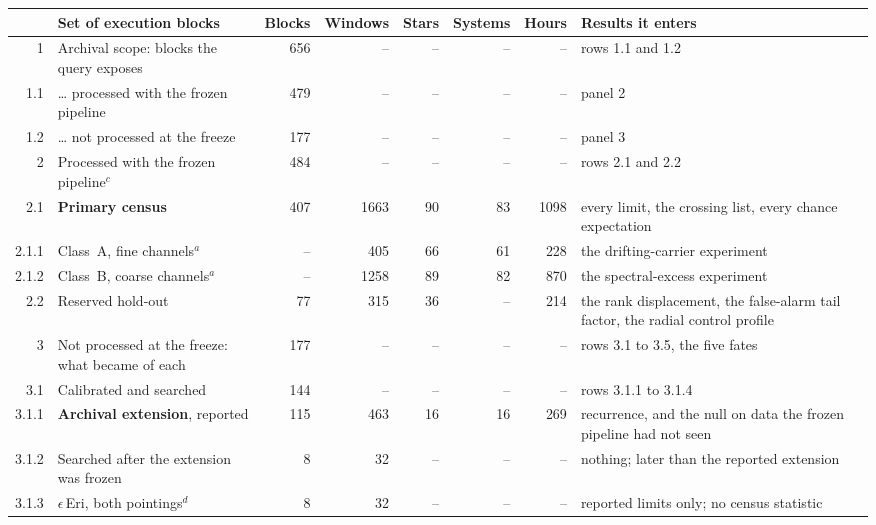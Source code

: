 \begin{tabular}{@{}r@{~}p{}rrrrrp{}@{}}
\hline
 & Set of execution blocks & Blocks & Windows & Stars & Systems & Hours & Results it enters \\
\hline
1 & Archival scope: blocks the query exposes & 656 & -- & -- & -- & -- & rows 1.1 and 1.2 \\
1.1 & \hspace{0.8em}\ldots{} processed with the frozen pipeline & 479 & -- & -- & -- & -- & panel 2 \\
1.2 & \hspace{0.8em}\ldots{} not processed at the freeze & 177 & -- & -- & -- & -- & panel 3 \\
\hline
2 & Processed with the frozen pipeline$^{c}$ & 484 & -- & -- & -- & -- & rows 2.1 and 2.2 \\
2.1 & \hspace{0.8em}\textbf{Primary census} & 407 & 1663 & 90 & 83 & 1098 & every limit, the crossing list, every chance expectation \\
2.1.1 & \hspace{1.6em}Class~A, fine channels$^{a}$ & -- & 405 & 66 & 61 & 228 & the drifting-carrier experiment \\
2.1.2 & \hspace{1.6em}Class~B, coarse channels$^{a}$ & -- & 1258 & 89 & 82 & 870 & the spectral-excess experiment \\
2.2 & \hspace{0.8em}Reserved hold-out & 77 & 315 & 36 & -- & 214 & the rank displacement, the false-alarm tail factor, the radial control profile \\
\hline
3 & Not processed at the freeze: what became of each & 177 & -- & -- & -- & -- & rows 3.1 to 3.5, the five fates \\
3.1 & \hspace{0.8em}Calibrated and searched & 144 & -- & -- & -- & -- & rows 3.1.1 to 3.1.4 \\
3.1.1 & \hspace{1.6em}\textbf{Archival extension}, reported & 115 & 463 & 16 & 16 & 269 & recurrence, and the null on data the frozen pipeline had not seen \\
3.1.2 & \hspace{1.6em}Searched after the extension was frozen & 8 & 32 & -- & -- & -- & nothing; later than the reported extension \\
3.1.3 & \hspace{1.6em}$\epsilon$\,Eri, both pointings$^{d}$ & 8 & 32 & -- & -- & -- & reported limits only; no census statistic \\

\end{tabular}
